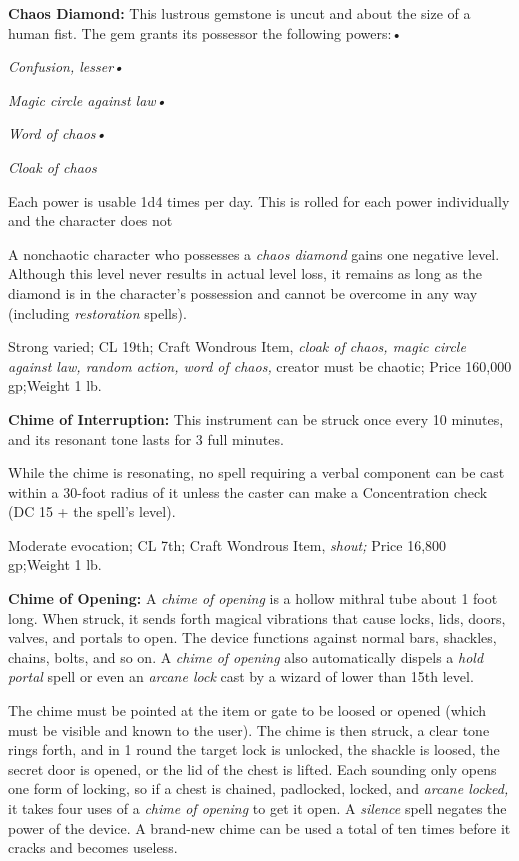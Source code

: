 \textbf{Chaos Diamond:} This lustrous gemstone is uncut and about the size of a 
human fist. The gem grants its possessor the following powers:•

\textit{Confusion, lesser•}

\textit{Magic circle against law•}

\textit{Word of chaos•}

\textit{Cloak of chaos}

Each power is usable 1d4 times per day. This is rolled for each power individually 
and the character does not 

A nonchaotic character who possesses a \textit{chaos diamond }gains one negative 
level. Although this level never results in actual level loss, it remains as long 
as the diamond is in the character's possession and cannot be overcome in any way 
(including \textit{restoration }spells).

Strong varied; CL 19th; Craft Wondrous Item, \textit{cloak of chaos, magic circle 
against law, random action, word of chaos, }creator must be chaotic; Price 160,000 
gp;Weight 1 lb.

\textbf{Chime of Interruption:} This instrument can be struck once every 10 minutes, 
and its resonant tone lasts for 3 full minutes.

While the chime is resonating, no spell requiring a verbal component can be cast 
within a 30-foot radius of it unless the caster can make a Concentration check 
(DC 15 + the spell's level).

Moderate evocation; CL 7th; Craft Wondrous Item, \textit{shout; }Price 16,800 gp;Weight 
1 lb.

\textbf{Chime of Opening:} A \textit{chime of opening }is a hollow mithral tube 
about 1 foot long. When struck, it sends forth magical vibrations that cause locks, 
lids, doors, valves, and portals to open. The device functions against normal bars, 
shackles, chains, bolts, and so on. A \textit{chime of opening }also automatically 
dispels a \textit{hold portal }spell or even an \textit{arcane lock }cast by a 
wizard of lower than 15th level.

The chime must be pointed at the item or gate to be loosed or opened (which must 
be visible and known to the user). The chime is then struck, a clear tone rings 
forth, and in 1 round the target lock is unlocked, the shackle is loosed, the secret 
door is opened, or the lid of the chest is lifted. Each sounding only opens one 
form of locking, so if a chest is chained, padlocked, locked, and \textit{arcane 
locked, }it takes four uses of a \textit{chime of opening }to get it open. A \textit{silence 
}spell negates the power of the device. A brand-new chime can be used a total of 
ten times before it cracks and becomes useless.

